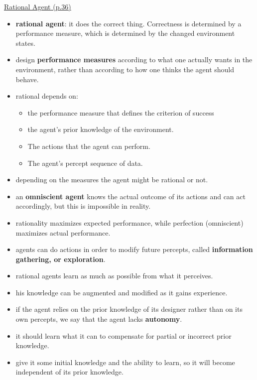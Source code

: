 \underline{Rational Agent (p.36)}
\begin{itemize}[noitemsep,nolistsep]
	\item \textbf{rational agent}: it does the correct thing. Correctness is determined by a performance measure, which is determined by the changed environment states.
	\item design \textbf{performance measures} according to what one actually wants in the environment, rather than according to how one thinks the agent should behave.
	\item rational depends on:
	\begin{itemize}
		\item the performance measure that defines the criterion of success
		\item the agent’s prior knowledge of the environment.
		\item The actions that the agent can perform.
		\item The agent’s percept sequence of data.
	\end{itemize}
	\item depending on the measures the agent might be rational or not. 
	\item an \textbf{omniscient agent} knows the actual outcome of its actions and can act accordingly, but this is impossible in reality.
	\item rationality maximizes expected performance, while perfection (omniscient) maximizes actual performance.
	\item agents can do actions in order to modify future percepts, called \textbf{information gathering, or exploration}.
	\item rational agents learn as much as possible from what it perceives.
	\item his knowledge can be augmented and modified as it gains experience.
	\item if the agent relies on the prior knowledge of its designer rather than on its own percepts, we say that the agent lacks \textbf{autonomy}.
	\item it should learn what it can to compensate for partial or incorrect prior knowledge.
	\item give it some initial knowledge and the ability to learn, so it will become independent of its prior knowledge.
\end{itemize}

